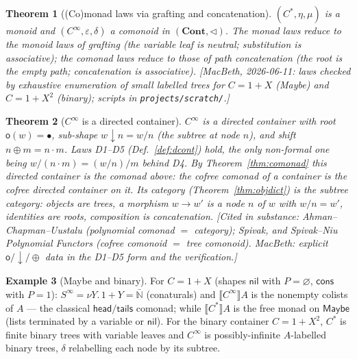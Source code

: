 \documentclass[11pt,a4paper]{book}
\newcommand{\Cont}{\mathbf{Cont}}
\newcommand{\Ext}[1]{\llbracket #1 \rrbracket}
\theoremstyle{plain}
\newtheorem{Theorem}{Theorem}[chapter]
\theoremstyle{definition}
\newtheorem{Example}[Theorem]{Example}
\theoremstyle{remark}
\newcommand{\prov}[1]{\hfill\textsf{\footnotesize[#1]}}
\begin{document}
\begin{Theorem}[(Co)monad laws via grafting and concatenation]\label{thm:freecofree-laws}
$(C^{*},\eta,\mu)$ is a monoid and $(C^{\infty},\varepsilon,\delta)$ a comonoid in
$(\Cont,\triangleleft)$. The monad laws reduce to the monoid laws of grafting (the variable
leaf is neutral; substitution is associative); the comonad laws reduce to those of path
concatenation (the root is the empty path; concatenation is associative).
\prov{MacBeth, 2026-06-11: laws checked by exhaustive enumeration of small labelled trees for
$C=1+X$ (Maybe) and $C=1+X^{2}$ (binary); scripts in \texttt{projects/scratch/}.}
\end{Theorem}

\begin{Theorem}[$C^{\infty}$ is a directed container]\label{thm:cofree-dircont}
$C^{\infty}$ is a directed container with root $\mathsf o(w)=\bullet$, sub-shape
$w\downarrow n=w/n$ (the subtree at node $n$), and shift $n\oplus m=n\cdot m$. Laws
\textup{D1--D5} (Def.~\ref{def:dcont}) hold, the only non-formal one being
$w/(n\cdot m)=(w/n)/m$ behind \textup{D4}. By Theorem~\ref{thm:comonad} this directed
container \emph{is} the comonad above: the cofree comonad of a container is the cofree
\emph{directed} container on it. Its category (Theorem~\ref{thm:objdict}) is the
\emph{subtree category}: objects are trees, a morphism $w\to w'$ is a node $n$ of $w$ with
$w/n=w'$, identities are roots, composition is concatenation.
\prov{Cited in substance: Ahman--Chapman--Uustalu (polynomial comonad $=$ category); Spivak,
and Spivak--Niu \emph{Polynomial Functors} (cofree comonoid $=$ tree comonoid). MacBeth:
explicit $\mathsf o/\!\downarrow\!/\oplus$ data in the D1--D5 form and the verification.}
\end{Theorem}

\begin{Example}[Maybe and binary]\label{ex:freecofree}
For $C=1+X$ (shapes $\mathsf{nil}$ with $P=\varnothing$, $\mathsf{cons}$ with $P=1$):
$S^{\infty}=\nu Y.\,1+Y=\bar{\mathbb N}$ (conaturals) and $\Ext{C^{\infty}}A$ is the
nonempty colists of $A$ --- the classical $\mathsf{head}/\mathsf{tails}$ comonad; while
$\Ext{C^{*}}A$ is the free monad on $\mathsf{Maybe}$ (lists terminated by a variable or
$\mathsf{nil}$). For the binary container $C=1+X^{2}$, $C^{*}$ is finite binary trees with
variable leaves and $C^{\infty}$ is possibly-infinite $A$-labelled binary trees, $\delta$
relabelling each node by its subtree.
\end{Example}
\end{document}

